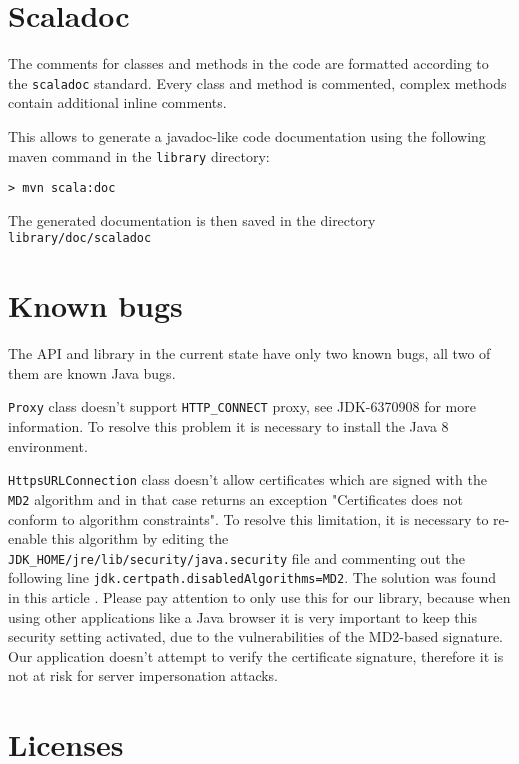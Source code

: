 \documentclass[
	a4paper,					10pt,							twoside,					openright,				notitlepage,			parskip=half,			]{scrreprt}
\begin{document}
\section{Scaladoc}
\label{sec:secperf_scaladoc}
The comments for classes and methods in the code are formatted according to the \verb|scaladoc| standard. 
Every class and method is commented, complex methods contain additional inline comments.

This allows to generate a javadoc-like code documentation using the following maven command in the \verb|library| directory:
\begin{lstlisting}[language={}]
> mvn scala:doc
\end{lstlisting}
The generated documentation is then saved in the directory \verb|library/doc/scaladoc|

\section{Known bugs}
\label{sec:secperf_bugs}

The API and library in the current state have only two known bugs, all two of them are known Java bugs.

\verb|Proxy| class doesn't support \verb|HTTP_CONNECT| proxy, see JDK-6370908 \cite{bug:proxy} for more information.
To resolve this problem it is necessary to install the Java 8 environment.

\verb|HttpsURLConnection| class doesn't allow certificates which are signed with the \verb|MD2| algorithm and in that case 
returns an exception "Certificates does not conform to algorithm constraints". To resolve this limitation, it is necessary 
to re-enable this algorithm by editing the \verb|JDK_HOME/jre/lib/security/java.security| file and commenting out the following line 
\verb|jdk.certpath.disabledAlgorithms=MD2|. The solution was found in this article \cite{bug:ssl}.
Please pay attention to only use this for our library, because when using other applications like a Java browser it is very
important to keep this security setting activated, due to the vulnerabilities of the \gls{MD2}-based signature.
Our application doesn't attempt to verify the certificate signature, therefore it is not at risk for server impersonation attacks.

\section{Licenses}
\label{sec:secperf_licenses}
\end{document}
